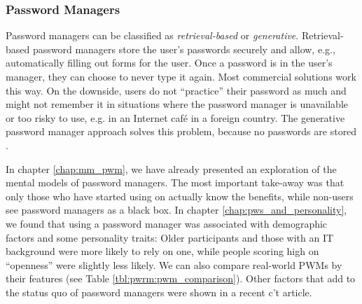 \subsubsection{Password Managers} 
Password managers can be classified as \textit{retrieval-based} or \textit{generative}. Retrieval-based password managers store the user's passwords securely and allow, e.g., automatically filling out forms for the user. Once a password is in the user's manager, they can choose to never type it again. Most commercial solutions work this way. On the downside, users do not ``practice'' their password as much and might not remember it in situations where the password manager is unavailable or too risky to use, e.g. in an Internet café in a foreign country. The generative password manager approach solves this problem, because no passwords are stored \cite{McCarney2012Tapas}.  %

In chapter \ref{chap:mm_pwm}, we have already presented an exploration of the mental models of password managers. The most important take-away was that only those who have started using on actually know the benefits, while non-users see password managers as a black box. In chapter \ref{chap:pws_and_personality}, we found that using a password manager was associated with demographic factors and some personality traits: Older participants and those with an IT background were more likely to rely on one, while people scoring high on ``openness'' were slightly less likely. We can also compare real-world PWMs by their features (see Table \ref{tbl:pwrm:pwm_comparison}). Other factors that add to the status quo of password managers were shown in a recent c't article. 

